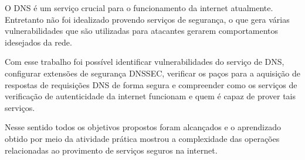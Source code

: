 \documentclass[a4paper]{report} %
\begin{document}
O DNS é um serviço crucial para o funcionamento da internet atualmente. Entretanto não foi idealizado provendo serviços de segurança, o que gera várias vulnerabilidades que são utilizadas para atacantes gerarem comportamentos idesejados da rede. 

Com esse trabalho foi possível identificar vulnerabilidades do serviço de DNS, configurar extensões de segurança DNSSEC, verificar os paços para a aquisição de respostas de requisições DNS de forma segura e compreender como os serviços de verificação de autenticidade da internet funcionam e quem é capaz de prover tais serviços. 

Nesse sentido todos os objetivos propostos foram alcançados e o aprendizado obtido por meio da atividade prática mostrou a complexidade das operações relacionadas ao provimento de serviços seguros na internet.
\end{document}
